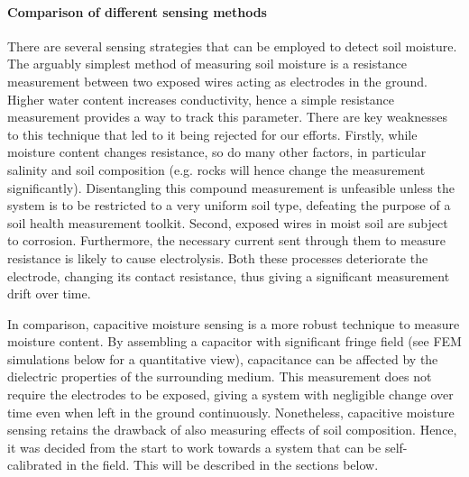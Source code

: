 \paragraph{Comparison of different sensing methods} %
There are several sensing strategies that can be employed to detect soil moisture.\cite{surveymethodssoilschmuggeetal1980} The arguably simplest method of measuring soil moisture is a resistance measurement between two exposed wires acting as electrodes in the ground. Higher water content increases conductivity, hence a simple resistance measurement provides a way to track this parameter. There are key weaknesses to this technique that led to it being rejected for our efforts. Firstly, while moisture content changes resistance, so do many other factors, in particular salinity and soil composition (e.g. rocks will hence change the measurement significantly). Disentangling this compound measurement is unfeasible unless the system is to be restricted to a very uniform soil type, defeating the purpose of a soil health measurement toolkit.\cite{criticalreviewsoilsushalekshmietal2014} Second, exposed wires in moist soil are subject to corrosion. Furthermore, the necessary current sent through them to measure resistance is likely to cause electrolysis. Both these processes deteriorate the electrode, changing its contact resistance, thus giving a significant measurement drift over time.\cite{criteriasoilaggressivenessboothetal1967}

In comparison, capacitive moisture sensing is a more robust technique to measure moisture content. By assembling a capacitor with significant fringe field (see \gls{FEM} simulations below for a quantitative view), capacitance can be affected by the dielectric properties of the surrounding medium. This measurement does not require the electrodes to be exposed, giving a system with negligible change over time even when left in the ground continuously. Nonetheless, capacitive moisture sensing retains the drawback of also measuring effects of soil composition. Hence, it was decided from the start to work towards a system that can be self-calibrated in the field. This will be described in the sections below.

